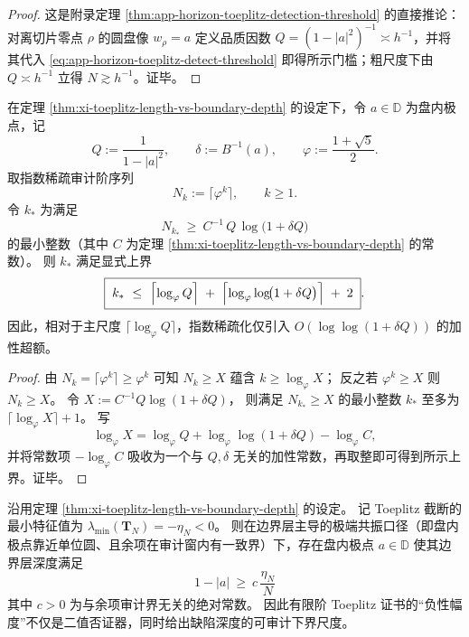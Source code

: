 \begin{proof}
这是附录定理 \ref{thm:app-horizon-toeplitz-detection-threshold} 的直接推论：对离切片零点 \(\rho\) 的圆盘像 \(w_\rho=a\) 定义品质因数 \(Q=(1-|a|^2)^{-1}\asymp h^{-1}\)，并将其代入 \eqref{eq:app-horizon-toeplitz-detect-threshold} 即得所示门槛；粗尺度下由 \(Q\asymp h^{-1}\) 立得 \(N\gtrsim h^{-1}\)。证毕。
\end{proof}

\begin{theorem}\label{thm:xi-phi-sparse-toeplitz-audit-loglog-overhead}
在定理 \ref{thm:xi-toeplitz-length-vs-boundary-depth} 的设定下，令 \(a\in\mathbb{D}\) 为盘内极点，记
\[
Q:=\frac{1}{1-|a|^2},\qquad
\delta:=B^{-1}(a),\qquad
\varphi:=\frac{1+\sqrt5}{2}.
\]
取指数稀疏审计阶序列
\[
N_k:=\lceil \varphi^k\rceil,\qquad k\ge 1.
\]
令 \(k_\ast\) 为满足
\[
N_{k_\ast}\ \ge\ C^{-1}\,Q\,\log\!\bigl(1+\delta Q\bigr)
\]
的最小整数（其中 \(C\) 为定理 \ref{thm:xi-toeplitz-length-vs-boundary-depth} 的常数）。
则 \(k_\ast\) 满足显式上界
\[
\boxed{\;
k_\ast
\ \le\
\Bigl\lceil \log_\varphi Q\Bigr\rceil
\;+\;
\Bigl\lceil \log_\varphi\log\!\bigl(1+\delta Q\bigr)\Bigr\rceil
\;+\;2\; }.
\]
因此，相对于主尺度 \(\lceil\log_\varphi Q\rceil\)，指数稀疏化仅引入 \(O(\log\log(1+\delta Q))\) 的加性超额。
\end{theorem}
\begin{proof}
由 \(N_k=\lceil \varphi^k\rceil\ge \varphi^k\) 可知 \(N_k\ge X\) 蕴含 \(k\ge \log_\varphi X\)；
反之若 \(\varphi^k\ge X\) 则 \(N_k\ge X\)。
令
\(
X:=C^{-1}Q\log(1+\delta Q)
\)，
则满足 \(N_{k_\ast}\ge X\) 的最小整数 \(k_\ast\) 至多为 \(\lceil \log_\varphi X\rceil+1\)。
写
\[
\log_\varphi X
=\log_\varphi Q+\log_\varphi\log(1+\delta Q)-\log_\varphi C,
\]
并将常数项 \(-\log_\varphi C\) 吸收为一个与 \(Q,\delta\) 无关的加性常数，再取整即可得到所示上界。证毕。
\end{proof}

\begin{proposition}\label{prop:xi-toeplitz-min-eig-controls-depth}
沿用定理 \ref{thm:xi-toeplitz-length-vs-boundary-depth} 的设定。
记 Toeplitz 截断的最小特征值为 \(\lambda_{\min}(\mathbf{T}_N)=-\eta_N<0\)。
则在边界层主导的极端共振口径（即盘内极点靠近单位圆、且余项在审计窗内有一致界）下，存在盘内极点 \(a\in\mathbb{D}\) 使其边界层深度满足
\[
\boxed{\;
1-|a|\ \ge\ c\,\frac{\eta_N}{N}\;}
\]
其中 \(c>0\) 为与余项审计界无关的绝对常数。
因此有限阶 Toeplitz 证书的“负性幅度”不仅是二值否证器，同时给出缺陷深度的可审计下界尺度。
\end{proposition}

